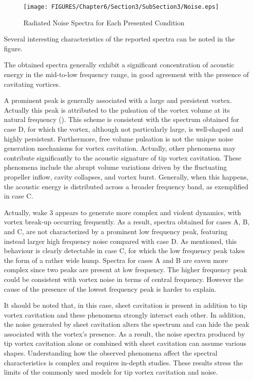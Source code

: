 \begin{figure}[h]
    \centering
    \texttt{[image: FIGURES/Chapter6/Section3/SubSection3/Noise.eps]}
    \caption{Radiated Noise Spectra for Each Presented Condition}
    \label{fig:NoiseSpectra}
\end{figure}

Several interesting characteristics of the reported spectra can be noted in the figure.

The obtained spectra generally exhibit a significant concentration of acoustic energy in the mid-to-low frequency range, in good agreement with the presence of cavitating vortices.

A prominent peak is generally associated with a large and persistent vortex. Actually this peak is attributed to the pulsation of the vortex volume at its natural frequency (\cite{ETV_JMSE}).
This scheme is consistent with the spectrum obtained for  case D, for which the vortex, although not particularly large, is well-shaped and highly persistent. 
Furthermore, free volume pulsation is not the  unique noise generation mechanisms for vortex cavitation. Actually, other phenomena may contribute significantly to the acoustic signature of tip vortex cavitation. These phenomena include the abrupt volume variations driven by the fluctuating propeller inflow, cavity collapses, and vortex burst.
Generally, when this happens, the acoustic energy is distributed across a broader frequency band, as exemplified in case C.

Actually, wake 3 appears to generate more complex and violent dynamics, with vortex break-up occurring frequently. As a result, spectra obtained for cases A, B, and C, are not characterized by a prominent low frequency peak, featuring instead larger high frequency noise compared with case D.
As mentioned, this behaviour is clearly detectable in case C, for which the low frequency peak takes the form of a rather wide hump.
Spectra for cases A and B are eaven more complex since two peaks are present at low frequency. The higher frequency peak could be consistent with vortex noise in terms of central frequency. However the cause of the presence of the lowest frequency peak is harder to explain.

It should be noted that, in this case, sheet cavitation is present in addition to tip vortex cavitation and these phenomena strongly interact each other. 
In addition, the noise generated by sheet cavitation alters the spectrum and can hide the peak associated with the vortex's presence.
As a result, the noise spectra produced by tip vortex cavitation alone or combined with sheet cavitation can assume various shapes. Understanding how the observed phenomena affect the spectral characteristics is complex and requires in-depth studies.
These results stress the limits of the commonly used models for tip vortex cavitation and noise.

